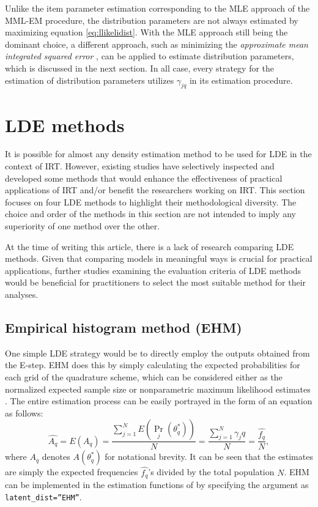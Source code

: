 Unlike the item parameter estimation corresponding to the MLE approach of the
MML-EM procedure, the distribution parameters are not always estimated by
maximizing equation \eqref{eq:llikelidist}. With the MLE approach still
being the dominant choice, a different approach, such as minimizing the \emph{approximate mean integrated squared error} \citep{Li:2022}, can be applied
to estimate distribution parameters, which is discussed in the
next section. In all case, every strategy for the estimation of
distribution parameters utilizes \(\gamma_{jq}\) in its
estimation procedure.

\hypertarget{lde-methods}{%
\section{LDE methods}\label{lde-methods}}

It is possible for almost any density estimation method to be used for LDE in the context of IRT.
However, existing studies have
selectively inspected and developed some methods that would enhance the
effectiveness of practical applications of IRT and/or benefit the
researchers working on IRT. This section focuses on four LDE
methods to highlight their methodological diversity. The choice
and order of the methods in this section are not intended to imply any
superiority of one method over the other.

At the time of writing this article, there is a lack of research comparing
LDE methods. Given that comparing models in meaningful ways is crucial for
practical applications, further studies examining the evaluation criteria of LDE methods
would be beneficial for practitioners to select the most suitable method for their analyses.

\hypertarget{empirical-histogram-method-ehm}{%
\subsection{Empirical histogram method (EHM)}\label{empirical-histogram-method-ehm}}

One simple LDE strategy would be to directly employ the outputs
obtained from the E-step. EHM does this by simply calculating the
expected probabilities for each grid of the quadrature scheme, which can
be considered either as the normalized expected sample size or
nonparametric maximum likelihood estimates \citep{Bock+Aitkin:1981, Laird:1978, Mislevy:1984}.
The entire estimation process can be easily
portrayed in the form of an equation as follows:
\begin{equation}
\hat{ A_{q}} =
E{\left( A_{q} \right)} =
\frac{\sum_{j = 1}^{N}{ E{\left(\Pr_{j}{\left( \theta_{q}^{*} \right)}\right)} }}{N} =
\frac{\sum_{j = 1}^{N}{\gamma_jq}}{N} =
\frac{\hat{f_q}}{N},
\label{eq:ehm}
\end{equation}
where \(A_{q}\) denotes \(A{\left( \theta^{*}_{q} \right)}\) for notational brevity.
It can be seen that the estimates are simply
the expected frequencies \(\hat{f_q}\)'s divided by the total population
\(N\). EHM can be implemented in the estimation functions of
 by specifying the argument as \texttt{latent\_dist=”EHM”}.

